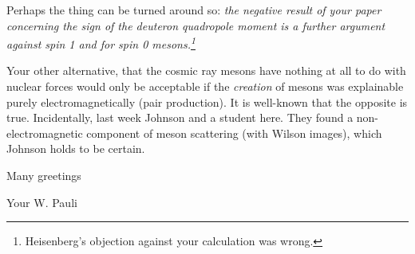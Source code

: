 Perhaps the thing can be turned around so: \textit{the negative result of your paper concerning the sign of the deuteron quadropole moment is a further argument against spin 1 and for spin 0 mesons.\footnote{Heisenberg's objection against your calculation was wrong.}}

Your other alternative, that the cosmic ray mesons have nothing at all to do with nuclear forces \comment{!!!} would only be acceptable if the \textit{creation} of mesons was explainable purely electromagnetically (pair production). It is well-known that the opposite is true. Incidentally, last week Johnson and a student  here. They found a non-electromagnetic component of meson scattering (with Wilson images), which Johnson holds to be certain.

Many greetings 

Your W. Pauli

